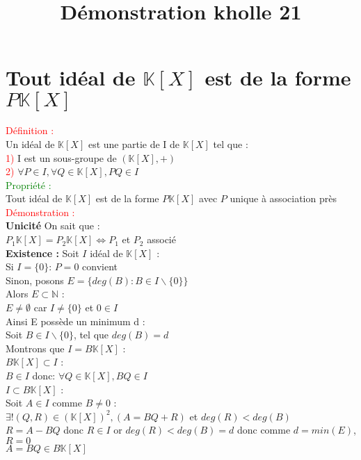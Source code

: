 \documentclass{article}
\begin{document}
\title{Démonstration kholle 21}
\date{}
\maketitle
	\renewcommand{\thesection}{\Roman{section}}
	\setlength{\parindent}{1.5cm}
\section{Tout idéal de $\mathbb K [X]$ est de la forme $P \mathbb K [X]$}
\textcolor{red}{Définition :} \\
Un idéal de $\mathbb{K}[X]$ est une partie de I de $\mathbb K [X]$ tel que : \\
\textcolor{red}{1)} I est un sous-groupe de $(\mathbb K[X],+)$ \\
\textcolor{red}{2)} $\forall P \in I, \forall Q \in \mathbb K[X], PQ \in I$ \\
\textcolor{green}{Propriété :} \\
Tout idéal de $\mathbb K [X]$ est de la forme $P \mathbb K[X]$ avec $P$ unique à association près \\
\textcolor{red}{Démonstration :} \\
{\bf Unicité} On sait que : \\
$P_1 \mathbb K [X]=P_2 \mathbb K [X] \Longleftrightarrow P_1$ et $P_2$ associé \\
{\bf Existence :} Soit $I$ idéal de $\mathbb K [X] $ : \\
Si $I=\lbrace 0 \rbrace$: $P=0$ convient \\
Sinon, posons $E= \lbrace deg(B):B \in I \backslash \lbrace 0 \rbrace \rbrace $ \\
Alors $E \subset \mathbb{N}$ : \\
$E \neq \emptyset$ car $I \neq \lbrace 0 \rbrace$ et $0 \in I$ \\
Ainsi E possède un minimum d : \\
Soit $B \in I \backslash \lbrace 0 \rbrace$, tel que $deg(B)=d$ \\
Montrons que $I=B \mathbb K [X]$ : \\
{\boldmath$B \mathbb K [X] \subset I$ }: \\
$B \in I$ donc: $ \forall Q \in \mathbb K[X], BQ \in I$ \\
{\boldmath$I \subset B \mathbb K [X]$} :\\
Soit $A \in I$ comme $B \neq 0$ : \\
$\exists ! (Q,R) \in (\mathbb K [X])^2, (A=BQ+R)$ et $deg(R) < deg(B)$ \\
$R=A-BQ$ donc $R \in I$ or $deg(R)<deg(B)=d$ donc comme $d=min(E)$, $R=0$ \\
$A=BQ \in B \mathbb K [X]$
\end{document}
